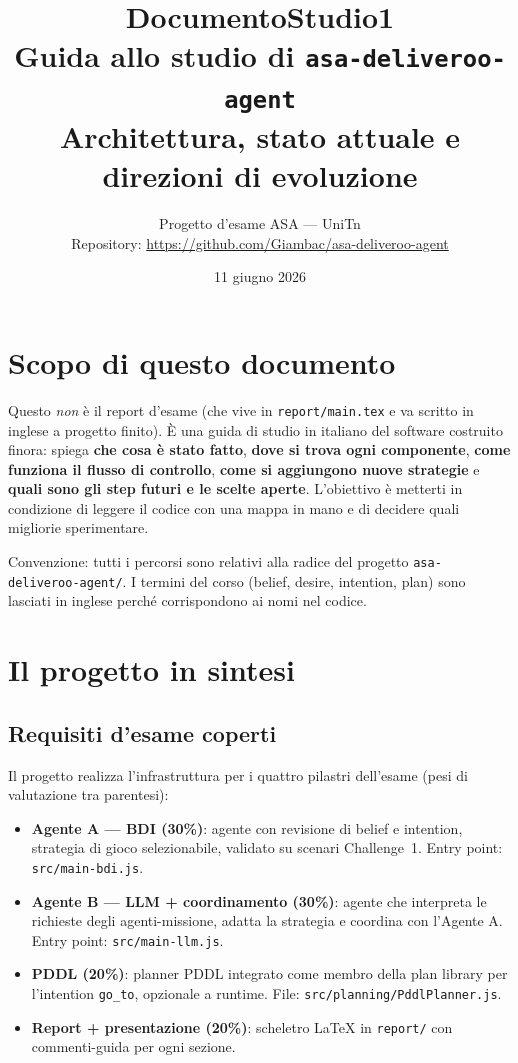 \documentclass[11pt,a4paper]{article}
\title{\textbf{DocumentoStudio1}\\[2mm]
  \large Guida allo studio di \texttt{asa-deliveroo-agent}\\
  Architettura, stato attuale e direzioni di evoluzione}
\author{Progetto d'esame ASA --- UniTn\\
  \small Repository: \url{https://github.com/Giambac/asa-deliveroo-agent}}
\date{11 giugno 2026}
\newcommand{\file}[1]{\texttt{#1}}
\newcommand{\code}[1]{\texttt{#1}}
\begin{document}
\maketitle

\tableofcontents
\newpage

\section{Scopo di questo documento}

Questo \emph{non} è il report d'esame (che vive in \file{report/main.tex} e
va scritto in inglese a progetto finito). È una guida di studio in italiano
del software costruito finora: spiega \textbf{che cosa è stato fatto},
\textbf{dove si trova ogni componente}, \textbf{come funziona il flusso di
controllo}, \textbf{come si aggiungono nuove strategie} e \textbf{quali sono
gli step futuri e le scelte aperte}. L'obiettivo è metterti in condizione di
leggere il codice con una mappa in mano e di decidere quali migliorie
sperimentare.

Convenzione: tutti i percorsi sono relativi alla radice del progetto
\file{asa-deliveroo-agent/}. I termini del corso (belief, desire, intention,
plan) sono lasciati in inglese perché corrispondono ai nomi nel codice.

\section{Il progetto in sintesi}

\subsection{Requisiti d'esame coperti}

Il progetto realizza l'infrastruttura per i quattro pilastri dell'esame
(pesi di valutazione tra parentesi):

\begin{itemize}
  \item \textbf{Agente A — BDI (30\%)}: agente con revisione di belief e
    intention, strategia di gioco selezionabile, validato su scenari
    Challenge~1. Entry point: \file{src/main-bdi.js}.
  \item \textbf{Agente B — LLM + coordinamento (30\%)}: agente che
    interpreta le richieste degli agenti-missione, adatta la strategia e
    coordina con l'Agente A. Entry point: \file{src/main-llm.js}.
  \item \textbf{PDDL (20\%)}: planner PDDL integrato come membro della plan
    library per l'intention \code{go\_to}, opzionale a runtime.
    File: \file{src/planning/PddlPlanner.js}.
  \item \textbf{Report + presentazione (20\%)}: scheletro LaTeX in
    \file{report/} con commenti-guida per ogni sezione.
\end{itemize}
\end{document}
